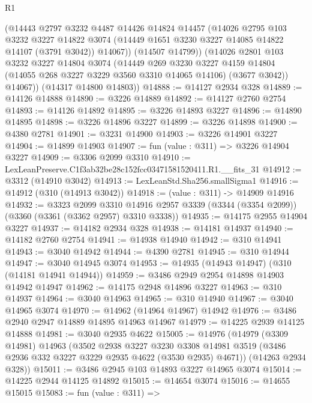 \begin{lexlean}{R1}
\begin{coremodule}
          (@14443
            @2797
            @3232
            @4487
            @14426
            @14824
            @14457
            (@14026
              @2795
              @103
              @3232
              @3227
              @14822
              @3074
              (@14449 @1651 @3230 @3227 @14085 @14822 @14107 (@3791 @3042))
              @14067))
          (@14507 @14799))
        (@14026
          @2801
          @103
          @3232
          @3227
          @14804
          @3074
          (@14449
            @269
            @3230
            @3227
            @4159
            @14804
            (@14055 @268 @3227 @3229 @3560 @3310 @14065 @14106)
            (@3677 @3042))
          @14067))
      (@14317 @14800 @14803))
@14888 := @14127 @2934 @328
@14889 := @14126 @14888
@14890 := @3226 @14889
@14892 := @14127 @2760 @2754
@14893 := @14126 @14892
@14895 := @3226 @14893 @3227
@14896 := @14890 @14895
@14898 := @3226 @14896 @3227
@14899 := @3226 @14898
@14900 := @4380 @2781
@14901 := @3231 @14900
@14903 := @3226 @14901 @3227
@14904 := @14899 @14903
@14907 := fun (value : @311) => @3226 @14904 @3227
@14909 := @3306 @2099 @3310
@14910 := LexLeanPreserve.C1f3ab32be28c152fcc03471581520411.R1.__fits_31
@14912 := @3312 (@14910 @3042)
@14913 := LexLeanStd.Sha256.smallSigma1
@14916 := @14912 (@310 (@14913 @3042))
@14918 := (value : @311) -> @14909 @14916
@14932 := @3323
    @2099
    @3310
    @14916
    @2957
    @3339
    (@3344 (@3354 @2099))
    (@3360 (@3361 (@3362 @2957) @3310 @3338))
@14935 := @14175 @2955 @14904 @3227
@14937 := @14182 @2934 @328
@14938 := @14181 @14937
@14940 := @14182 @2760 @2754
@14941 := @14938 @14940
@14942 := @310 @14941
@14943 := @3040 @14942
@14944 := @4390 @2781
@14945 := @310 @14944
@14947 := @3040 @14945 @3074
@14953 := @14935 (@14943 @14947) (@310 (@14181 @14941 @14944))
@14959 := @3486 @2949 @2954 @14898 @14903 @14942 @14947
@14962 := @14175 @2948 @14896 @3227
@14963 := @310 @14937
@14964 := @3040 @14963
@14965 := @310 @14940
@14967 := @3040 @14965 @3074
@14970 := @14962 (@14964 @14967) @14942
@14976 := @3486 @2940 @2947 @14889 @14895 @14963 @14967
@14979 := @14225 @2939 @14125 @14888
@14981 := @3040 @2935 @4622
@15005 := @14976
    (@14979
      (@3309 @14981)
      @14963
      (@3502
        @2938
        @3227
        @3230
        @3308
        @14981
        @3519
        (@3486 @2936 @332 @3227 @3229 @2935 @4622 (@3530 @2935) @4671))
      (@14263 @2934 @328))
@15011 := @3486 @2945 @103 @14893 @3227 @14965 @3074
@15014 := @14225 @2944 @14125 @14892
@15015 := @14654 @3074
@15016 := @14655 @15015
@15083 := fun (value : @311) =>

\end{coremodule}
\end{lexlean}
